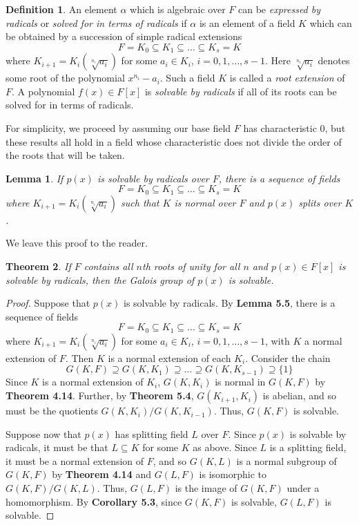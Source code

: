 \documentclass[12pt,leqno]{article}
\numberwithin{equation}{section}
\theoremstyle{plain}
\newtheorem{thm}{Theorem}[section]
\newtheorem{lem}[thm]{Lemma}
\theoremstyle{definition}
\newtheorem*{Def}{Definition}
\theoremstyle{remark}
\begin{document}
\begin{Def}
An element $\alpha$ which is algebraic over $F$ can be \textit{expressed by radicals} or \textit{solved for in terms of radicals} if $\alpha$ is an element of a field $K$ which can be obtained by a succession of simple radical extensions \[F=K_0\subseteq K_1\subseteq\hdots\subseteq K_s=K\] where $K_{i+1}=K_i(\sqrt[n_i]{a_i})$ for some $a_i\in K_i$, $i=0,1,\hdots,s-1$. Here $\sqrt[n_i]{a_i}$ denotes some root of the polynomial $x^{n_i}-a_i$. Such a field $K$ is called a \textit{root extension} of $F$. A polynomial $f(x)\in F[x]$ is \textit{solvable by radicals} if all of its roots can be solved for in terms of radicals. 
\end{Def}
 
 For simplicity, we proceed by assuming our base field $F$ has characteristic 0, but these results all hold in a field whose characteristic does not divide the order of the roots that will be taken.

\begin{lem}
 If $p(x)$ is solvable by radicals over $F$, there is a sequence of fields \[F=K_0\subseteq K_1\subseteq\hdots\subseteq K_s=K\] where $K_{i+1}=K_i(\sqrt[n_i]{a_i})$ such that $K$ is normal over $F$ and $p(x)$ splits over $K$.
\end{lem}

We leave this proof to the reader.

\begin{thm}
 If $F$ contains all $n$th roots of unity for all $n$ and $p(x)\in F[x]$ is solvable by radicals, then the Galois group of $p(x)$ is solvable.
\end{thm}

\begin{proof}
 Suppose that $p(x)$ is solvable by radicals. By \textbf{Lemma 5.5}, there is a sequence of fields \[F=K_0\subseteq K_1\subseteq\hdots\subseteq K_s=K\] where $K_{i+1}=K_i(\sqrt[n_i]{a_i})$ for some $a_i\in K_i$, $i=0,1,\hdots,s-1$, with $K$ a normal extension of $F$. Then $K$ is a normal extension of each $K_i$. Consider the chain \[G(K,F)\supseteq G(K,K_{1})\supseteq\hdots\supseteq G(K,K_{s-1})\supseteq\{1\}\] Since $K$ is a normal extension of $K_i$, $G(K,K_i)$ is normal in $G(K,F)$ by \textbf{Theorem 4.14}. Further, by \textbf{Theorem 5.4}, $G(K_{i+1},K_i)$ is abelian, and so must be the quotients $G(K,K_i)/G(K,K_{i-1})$. Thus, $G(K,F)$ is solvable.

Suppose now that $p(x)$ has splitting field $L$ over $F$. Since $p(x)$ is solvable by radicals, it must be that $L\subseteq K$ for some $K$ as above. Since $L$ is a splitting field, it must be a normal extension of $F$, and so $G(K,L)$ is a normal subgroup of $G(K,F)$ by \textbf{Theorem 4.14} and $G(L,F)$ is isomorphic to $G(K,F)/G(K,L)$. Thus, $G(L,F)$ is the image of $G(K,F)$ under a homomorphism. By \textbf{Corollary 5.3}, since $G(K,F)$ is solvable, $G(L,F)$ is solvable.
\end{proof}
\end{document}
